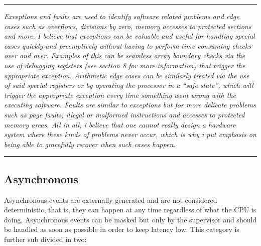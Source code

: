     \par\noindent\rule{\textwidth}{0.4pt}
    \textit{Exceptions and faults are used to identify software related problems and edge cases such as overflows, divisions by zero, memory accesses to protected sections and more. I believe that exceptions can be valuable and useful for handling special cases quickly and preemptively without having to perform time consuming checks over and over. Examples of this can be seamless array boundary checks via the use of debugging registers (see section 8 for more information) that trigger the appropriate exception. Arithmetic edge cases can be similarly treated via the use of said special registers or by operating the processor in a ``safe state'', which will trigger the appropriate exception every time something went wrong with the executing software. Faults are similar to exceptions but for more delicate problems such as page faults, illegal or malformed instructions and accesses to protected memory areas. All in all, i believe that one cannot really design a hardware system where these kinds of problems never occur, which is why i put emphasis on being able to gracefully recover when such cases happen.}
    \par\noindent\rule{\textwidth}{0.4pt}

    \subsection{Asynchronous}

        \vspace{10pt}

        Asynchronous events are externally generated and are not considered deterministic, that is, they can happen at any time regardless of what the CPU is doing. Asynchronous events can be masked but only by the supervisor and should be handled as soon as possible in order to keep latency low. This category is further sub divided in two:

